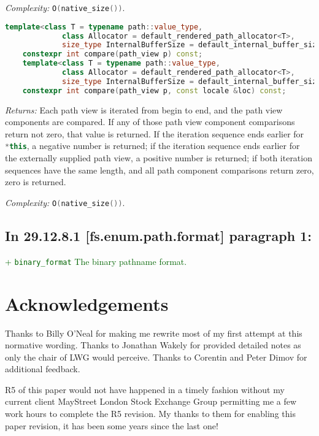 \documentclass[11pt]{article}
\newcommand{\code}[2][cpp]{\lstinline[language=#1,basicstyle=\small\ttfamily]{#2}}
\newcommand{\desc}[1]{\textit{#1}}
\newcommand{\returns}{\desc{Returns: }}
\newcommand{\complexity}{\desc{Complexity: }}
\newcommand{\tsrefp}[3]{\subsection*{In #2 \textbf{[#1]} paragraph #3:}}
\newcommand{\tsreplace}[3]{\textcolor{red}{\sout{#1}}#2\textcolor{darkgreen}{#3}}
\begin{document}
\complexity \code{O(native_size())}.\\

\begin{lstlisting}[language=cpp]
    template<class T = typename path::value_type,
             class Allocator = default_rendered_path_allocator<T>,
             size_type InternalBufferSize = default_internal_buffer_size>
    constexpr int compare(path_view p) const;
    template<class T = typename path::value_type,
             class Allocator = default_rendered_path_allocator<T>,
             size_type InternalBufferSize = default_internal_buffer_size>
    constexpr int compare(path_view p, const locale &loc) const;
\end{lstlisting}

\returns Each path view is iterated from begin to end, and the path view components are compared. If any of those path view component comparisons return not zero, that value is returned. If the iteration sequence ends earlier for \code{*this}, a negative number is returned; if the iteration sequence ends earlier for the externally supplied path view, a positive number is returned; if both iteration sequences have the same length, and all path component comparisons return zero, zero is returned.

\complexity \code{O(native_size())}.\\

\tsrefp{fs.enum.path.format}{29.12.8.1}{1}

\tsreplace{}{}{+ \code{binary_format} The binary pathname format.}

\color{black}

\section{Acknowledgements}

Thanks to Billy O'Neal for making me rewrite most of my first attempt at this normative wording. Thanks to Jonathan Wakely for provided detailed notes as only the chair of LWG would perceive. Thanks to Corentin and Peter Dimov for additional feedback.

R5 of this paper would not have happened in a timely fashion without my current client MayStreet London Stock Exchange Group permitting me a few work hours to complete the R5 revision. My thanks to them for enabling this paper revision, it has been some years since the last one!
\end{document}
